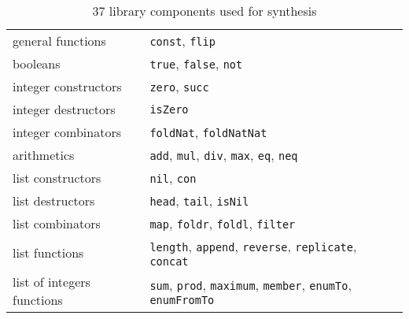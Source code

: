 \begin{longtable}{@{}l  p{}}
\caption{37 library components used for synthesis\label{fig:library-components}}\\
\toprule
general functions & \lstinline!const!, \lstinline?flip?\\
booleans & \lstinline?true?, \lstinline?false?, \lstinline?not?\\
integer constructors & \lstinline?zero?, \lstinline?succ?\\
integer destructors & \lstinline?isZero?\\
integer combinators & \lstinline?foldNat?, \lstinline?foldNatNat?\\
arithmetics & \lstinline?add?, \lstinline?mul?, \lstinline?div?, \lstinline?max?, \lstinline?eq?, \lstinline?neq?\\
list constructors & \lstinline?nil?, \lstinline?con?\\
list destructors & \lstinline?head?, \lstinline?tail?, \lstinline?isNil?\\
list combinators & \lstinline?map?, \lstinline?foldr?, \lstinline?foldl?, \lstinline?filter?\\
list functions & \lstinline?length?, \lstinline?append?, \lstinline?reverse?, \lstinline?replicate?, \lstinline?concat?\\
list of integers functions & \lstinline?sum?, \lstinline?prod?, \lstinline?maximum?, \lstinline?member?, \lstinline?enumTo?, \lstinline?enumFromTo?\\
\bottomrule
\end{longtable}